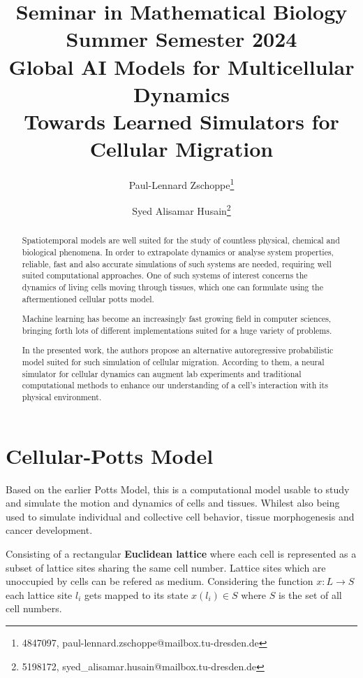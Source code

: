 \documentclass[a4paper,10pt,twocolumn]{article}
\date{}
\title{
    \small
    {\large Seminar in Mathematical Biology}\\
    Summer Semester 2024\\
    \vspace{1em}
    {\LARGE\bfseries Global AI Models for Multicellular Dynamics} \\ 
    {\Large Towards Learned Simulators for Cellular Migration}
}
\author{
    Paul-Lennard Zschoppe\footnote{4847097, paul-lennard.zschoppe@mailbox.tu-dresden.de}\\
    \and
    Syed Alisamar Husain\footnote{5198172, syed\_alisamar.husain@mailbox.tu-dresden.de}\\
}
\begin{document}
    \maketitle

    \begin{abstract}
        Spatiotemporal models are well suited for the study of countless physical, chemical and biological
        phenomena. In order to extrapolate dynamics or analyse system properties,
        reliable, fast and also accurate simulations of such systems are needed, requiring well suited computational approaches.
        One of such systems of interest concerns the dynamics of living cells moving through tissues,
        which one can formulate using the aftermentioned cellular potts model.

        Machine learning has become an increasingly fast growing field in computer sciences,
        bringing forth lots of different implementations suited for a huge variety of problems.

        In the presented work, the authors propose an alternative autoregressive probabilistic model suited 
        for such simulation of cellular migration.
        According to them, a neural simulator for cellular dynamics can augment lab experiments and 
        traditional computational methods to enhance our understanding of a cell's interaction 
        with its physical environment. 
    \end{abstract}



    \section{Cellular-Potts Model}
        Based on the earlier Potts Model, this is a computational model usable to study and simulate
        the motion and dynamics of cells and tissues. Whilest also being used to simulate 
        individual and collective cell behavior, tissue morphogenesis and cancer development.
        
        Consisting of a rectangular {\bfseries Euclidean lattice} where each cell is represented as a subset 
        of lattice sites sharing the same cell number. Lattice sites which are unoccupied by 
        cells can be refered as medium. 
        Considering the function $x: L \to S$ each lattice site $l_i$ gets mapped to its state 
        $x(l_i) \in S$ where $S$ is the set of all cell numbers.
\end{document}
